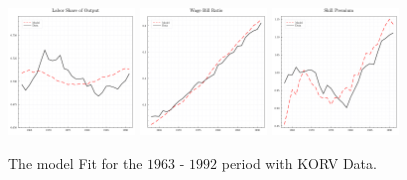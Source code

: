 \documentclass[12pt]{article}
\begin{document}
\begin{figure}[H]
 \centering
 \includegraphics[width=0.3\textwidth]{../images/fig:korv_estimation_ls_doc.pdf}
 \hfill
 \includegraphics[width=0.3\textwidth]{../images/fig:korv_estimation_wbr_doc.pdf}
 \hfill
 \includegraphics[width=0.3\textwidth]{../images/fig:korv_estimation_sp_doc.pdf}
 \caption{\label{fig:korv_estimation} The model Fit for the $1963$ - $1992$ period with KORV Data.}
\end{figure}
\end{document}
